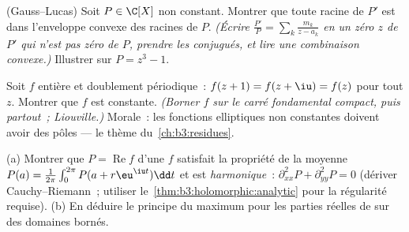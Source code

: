 \begin{exercise}[$\star\star\star$]\label{exo:b3:holomorphic:8}
(Gauss--Lucas) Soit $P \in \C[X]$ non constant. Montrer que
toute racine de $P'$ est dans l'enveloppe convexe des racines
de $P$. \emph{(Écrire $\frac{P'}{P} = \sum_k\frac{m_k}{z -
a_k}$ en un zéro $z$ de $P'$ qui n'est pas zéro de $P$,
prendre les conjugués, et lire une combinaison convexe.)}
Illustrer sur $P = z^3 - 1$.
\end{exercise}

\begin{exercise}[$\star\star\star$]\label{exo:b3:holomorphic:9}
Soit $f$ entière et doublement périodique~: $f(z + 1) = f(z +
\iu) = f(z)$ pour tout $z$. Montrer que $f$ est constante.
\emph{(Borner $f$ sur le carré fondamental compact, puis
partout~; Liouville.)} Morale~: les fonctions elliptiques non
constantes doivent avoir des pôles --- le thème
du~\cref{ch:b3:residues}.
\end{exercise}

\begin{exercise}[$\star\star$]\label{exo:b3:holomorphic:10}
(a) Montrer que $P = \operatorname{Re}f$ d'une $f$ 
satisfait la propriété de la moyenne $P(a) =
\frac1{2\pi}\int_0^{2\pi}P(a + r\eu^{\iu t})\dd t$ et est
\emph{harmonique}~: $\partial^2_{xx}P + \partial^2_{yy}P = 0$
(dériver Cauchy--Riemann~; utiliser
le~\cref{thm:b3:holomorphic:analytic} pour la régularité
requise).
(b) En déduire le principe du maximum pour les parties réelles
de  sur des domaines bornés.
\end{exercise}


